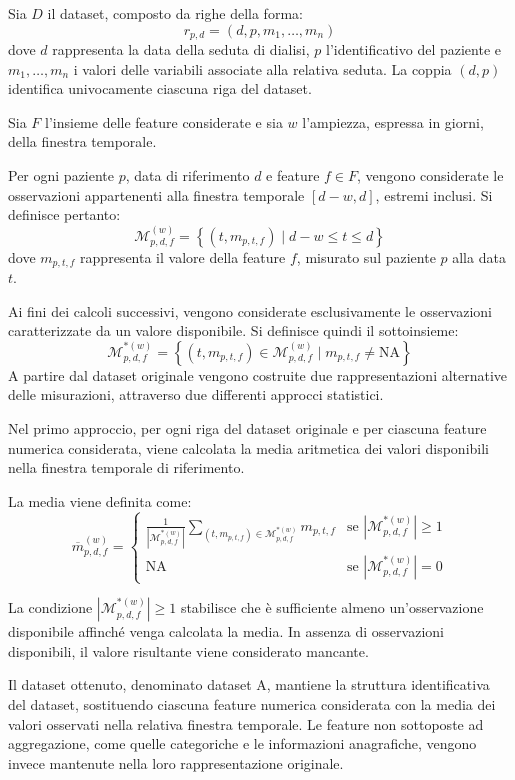\documentclass[a4paper,12pt]{report}
\begin{document}
Sia \(D\) il dataset, composto da righe della forma:
\[
r_{p,d} = (d,p,m_1,\ldots,m_n)
\]
dove \(d\) rappresenta la data della seduta di dialisi, \(p\) l'identificativo del paziente e \(m_1,\ldots,m_n\) i valori delle variabili associate alla relativa seduta. La coppia \((d,p)\) identifica univocamente ciascuna riga del dataset.

Sia \(F\) l'insieme delle feature considerate e sia \(w\) l'ampiezza, espressa in giorni, della finestra temporale.

Per ogni paziente \(p\), data di riferimento \(d\) e feature \(f\in F\), vengono considerate le osservazioni appartenenti alla finestra temporale \([d-w,d]\), estremi inclusi. Si definisce pertanto:
\[
\mathcal{M}_{p,d,f}^{(w)} =
\left\{
(t,m_{p,t,f}) \mid
d-w\leq t\leq d
\right\}
\]
dove \(m_{p,t,f}\) rappresenta il valore della feature \(f\), misurato sul paziente \(p\) alla data \(t\).

Ai fini dei calcoli successivi, vengono considerate esclusivamente le osservazioni caratterizzate da un valore disponibile. Si definisce quindi il sottoinsieme:
\[
\mathcal{M}_{p,d,f}^{*(w)} =
\left\{
(t,m_{p,t,f})\in\mathcal{M}_{p,d,f}^{(w)}
\mid m_{p,t,f}\neq\mathrm{NA}
\right\}
\]
A partire dal dataset originale vengono costruite due rappresentazioni alternative delle misurazioni, attraverso due differenti approcci statistici.

Nel primo approccio, per ogni riga del dataset originale e per ciascuna feature numerica considerata, viene calcolata la media aritmetica dei valori disponibili nella finestra temporale di riferimento.

La media viene definita come:
\[
\overline{m}_{p,d,f}^{(w)} =
\begin{cases}
\displaystyle
\frac{1}{|\mathcal{M}_{p,d,f}^{*(w)}|}
\sum_{(t,m_{p,t,f})\in\mathcal{M}_{p,d,f}^{*(w)}}
m_{p,t,f}
& \text{se }
|\mathcal{M}_{p,d,f}^{*(w)}|\geq 1 \\[12pt]
\mathrm{NA}
& \text{se }
|\mathcal{M}_{p,d,f}^{*(w)}|=0
\end{cases}
\]

La condizione \(|\mathcal{M}_{p,d,f}^{*(w)}|\geq 1\) stabilisce che è sufficiente almeno un'osservazione disponibile affinché venga calcolata la media. In assenza di osservazioni disponibili, il valore risultante viene considerato mancante.

Il dataset ottenuto, denominato dataset A, mantiene la struttura identificativa del dataset, sostituendo ciascuna feature numerica considerata con la media dei valori osservati nella relativa finestra temporale. Le feature non sottoposte ad aggregazione, come quelle categoriche e le informazioni anagrafiche, vengono invece mantenute nella loro rappresentazione originale.
\end{document}
